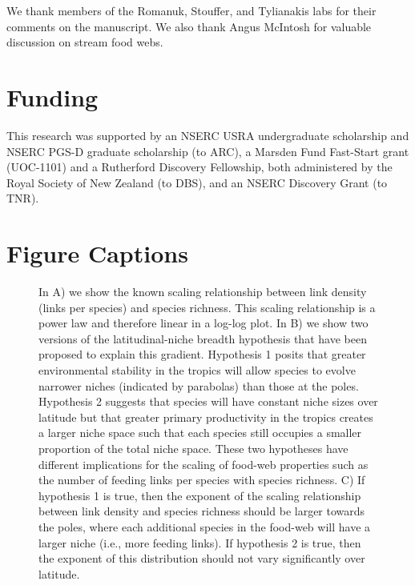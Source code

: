 \documentclass[12pt]{article}
\begin{document}
  We thank members of the Romanuk, Stouffer, and Tylianakis labs for their comments on
  the manuscript. We also thank Angus McIntosh for valuable discussion on stream food webs.

\section*{Funding}
  This research was supported by an NSERC USRA undergraduate scholarship and NSERC PGS-D 
  graduate scholarship (to ARC), a Marsden Fund Fast-Start grant (UOC-1101) and a 
  Rutherford Discovery Fellowship, both administered by the Royal Society of New Zealand 
  (to DBS), and an NSERC Discovery Grant (to TNR).


\newpage

\newpage

\section*{Figure Captions}

\begin{figure}[h]
\caption{In A) we show the known scaling relationship between link density (links per species) and 
species richness. This scaling relationship is a power law and therefore linear in a log-log plot.
In B) we show two versions of the latitudinal-niche breadth hypothesis that have been proposed to
explain this gradient. Hypothesis 1 posits that greater environmental stability in the tropics will 
allow species to evolve narrower niches (indicated by parabolas) than those at the poles. Hypothesis 2 
suggests that species will have constant niche sizes over latitude but that greater primary productivity 
in the tropics creates a larger niche space such that each species still occupies a smaller proportion 
of the total niche space. These two hypotheses have different implications for the scaling of food-web 
properties such as the number of feeding links per species with species richness. C) If hypothesis 1 is 
true, then the exponent of the scaling relationship between link density and species richness should 
be larger towards the poles, where each additional species in the food-web will have a larger niche 
(i.e., more feeding links). If hypothesis 2 is true, then the exponent of this distribution should 
not vary significantly over latitude.}
\label{concept}
\end{figure}
\end{document}
